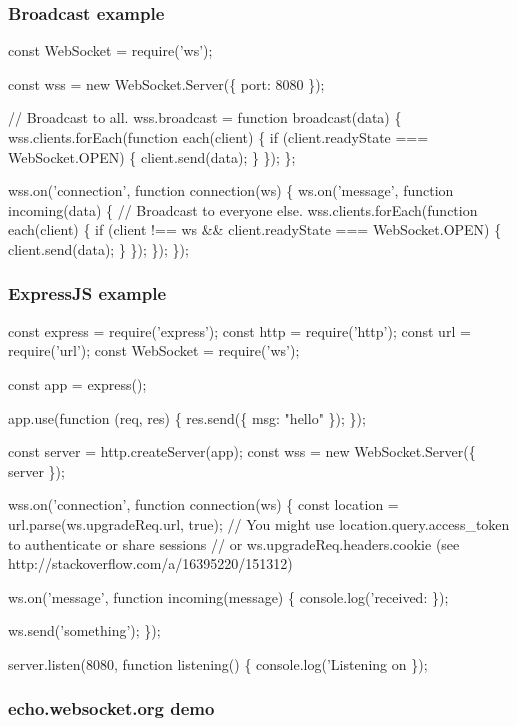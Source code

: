 \subsubsection*{Broadcast example}


\begin{DoxyCode}
const WebSocket = require('ws');

const wss = new WebSocket.Server(\{ port: 8080 \});

// Broadcast to all.
wss.broadcast = function broadcast(data) \{
  wss.clients.forEach(function each(client) \{
    if (client.readyState === WebSocket.OPEN) \{
      client.send(data);
    \}
  \});
\};

wss.on('connection', function connection(ws) \{
  ws.on('message', function incoming(data) \{
    // Broadcast to everyone else.
    wss.clients.forEach(function each(client) \{
      if (client !== ws && client.readyState === WebSocket.OPEN) \{
        client.send(data);
      \}
    \});
  \});
\});
\end{DoxyCode}


\subsubsection*{Express\+JS example}


\begin{DoxyCode}
const express = require('express');
const http = require('http');
const url = require('url');
const WebSocket = require('ws');

const app = express();

app.use(function (req, res) \{
  res.send(\{ msg: "hello" \});
\});

const server = http.createServer(app);
const wss = new WebSocket.Server(\{ server \});

wss.on('connection', function connection(ws) \{
  const location = url.parse(ws.upgradeReq.url, true);
  // You might use location.query.access\_token to authenticate or share sessions
  // or ws.upgradeReq.headers.cookie (see http://stackoverflow.com/a/16395220/151312)

  ws.on('message', function incoming(message) \{
    console.log('received: %
  \});

  ws.send('something');
\});

server.listen(8080, function listening() \{
  console.log('Listening on %
\});
\end{DoxyCode}


\subsubsection*{echo.\+websocket.\+org demo}


